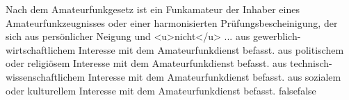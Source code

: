     {Nach dem Amateurfunkgesetz ist ein Funkamateur der Inhaber eines Amateurfunkzeugnisses oder einer harmonisierten Prüfungsbescheinigung, der sich aus persönlicher Neigung und <u>nicht</u> ...}
    {aus gewerblich-wirtschaftlichem Interesse mit dem Amateurfunkdienst befasst.}
    {aus politischem oder religiösem Interesse mit dem Amateurfunkdienst befasst.}
    {aus technisch-wissenschaftlichem Interesse mit dem Amateurfunkdienst befasst.}
    {aus sozialem oder kulturellem Interesse mit dem Amateurfunkdienst befasst.}
    {false}{false}